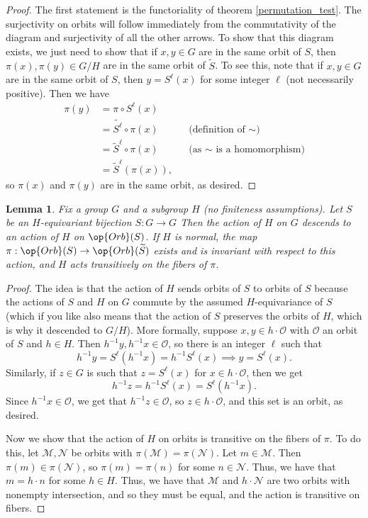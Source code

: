 \documentclass[12nt]{article}
\theoremstyle{plain}
\newtheorem{lemma}{Lemma}
\begin{document}
\begin{proof}
The first statement is the functoriality of theorem \ref{permutation_test}. The surjectivity on orbits will follow immediately from the commutativity of the diagram and surjectivity of all the other arrows. To show that this diagram exists, we just need to show that if $x, y \in G$ are in the same orbit of $S$, then $\pi(x), \pi(y) \in G/H$ are in the same orbit of $\widetilde{S}$. To see this, note that if $x, y \in G$ are in the same orbit of $S$, then $y = S^{\ell}(x)$ for some integer $\ell$ (not necessarily positive). Then we have
\begin{align*}
\pi(y) &= \pi \circ S^{\ell}(x) \\
	&= \widetilde{S^{\ell}} \circ \pi(x) && \text{(definition of $\sim$)}\\
	&= \widetilde{S}^\ell \circ \pi(x) && \text{(as $\sim$ is a homomorphism)} \\
	&= \widetilde{S}^\ell(\pi(x)),
\end{align*}
so $\pi(x)$ and $\pi(y)$ are in the same orbit, as desired.
\end{proof}

\begin{lemma}
Fix a group $G$ and a subgroup $H$ (no finiteness assumptions). Let $S$ be an $H$-equivariant bijection $S : G \to G$  Then the action of $H$ on $G$ descends to an action of $H$ on $\op{Orb}(S)$. If $H$ is normal, the map $\pi : \op{Orb}(S) \to \op{Orb}(\widetilde{S})$ exists and is invariant with respect to this action, and $H$ acts transitively on the fibers of $\pi$.
\end{lemma}

\begin{proof}
The idea is that the action of $H$ sends orbits of $S$ to orbits of $S$ because the actions of $S$ and $H$ on $G$ commute by the assumed $H$-equivariance of $S$ (which if you like also means that the action of $S$ preserves the orbits of $H$, which is why it descended to $G/H$). More formally, suppose $x, y \in h \cdot \mathcal{O}$ with $\mathcal{O}$ an orbit of $S$ and $h \in H$. Then $h^{-1}y, h^{-1}x \in \mathcal{O}$, so there is an integer $\ell$ such that
\[
h^{-1}y = S^{\ell}(h^{-1}x) = h^{-1}S^{\ell}(x) \implies y = S^{\ell}(x).
\]
Similarly, if $z \in G$ is such that $z = S^{\ell}(x)$ for $x \in h \cdot \mathcal{O}$, then we get
\[
h^{-1}z = h^{-1}S^{\ell}(x) = S^{\ell}(h^{-1}x).
\]
Since $h^{-1}x \in \mathcal{O}$, we get that $h^{-1}z \in \mathcal{O}$, so $z \in h \cdot \mathcal{O}$, and this set is an orbit, as desired.

Now we show that the action of $H$ on orbits is transitive on the fibers of $\pi$. To do this, let $\mathcal{M}, \mathcal{N}$ be orbits with $\pi(\mathcal{M}) = \pi(\mathcal{N})$. Let $m \in \mathcal{M}$. Then $\pi(m) \in \pi(\mathcal{N})$, so $\pi(m) = \pi(n)$ for some $n \in \mathcal{N}$. Thus, we have that $m = h \cdot n$ for some $h \in H$. Thus, we have that $\mathcal{M}$ and $h \cdot \mathcal{N}$ are two orbits with nonempty intersection, and so they must be equal, and the action is transitive on fibers. 

\end{proof}
\end{document}
